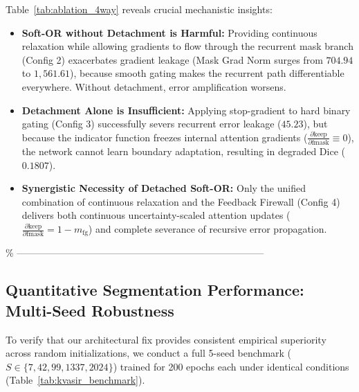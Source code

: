 Table~\ref{tab:ablation_4way} reveals crucial mechanistic insights:
\begin{itemize}
  \item \textbf{Soft-OR without Detachment is Harmful:} Providing continuous
        relaxation while allowing gradients to flow through the recurrent mask
        branch (Config 2) exacerbates gradient leakage (Mask Grad Norm surges
        from $704.94$ to $1{,}561.61$), because smooth gating makes the recurrent
        path differentiable everywhere. Without detachment, error amplification worsens.
  \item \textbf{Detachment Alone is Insufficient:} Applying stop-gradient to hard
        binary gating (Config 3) successfully severs recurrent error leakage
        ($45.23$), but because the indicator function freezes internal attention
        gradients ($\frac{\partial \text{keep}}{\partial \text{fmask}} \equiv 0$),
        the network cannot learn boundary adaptation, resulting in degraded Dice ($0.1807$).
  \item \textbf{Synergistic Necessity of Detached Soft-OR:} Only the unified
        combination of continuous relaxation and the Feedback Firewall (Config 4)
        delivers both continuous uncertainty-scaled attention updates
        ($\frac{\partial \text{keep}}{\partial \text{fmask}} = 1 - m_{\text{fg}}$)
        and complete severance of recursive error propagation.
\end{itemize}

\% -----------------------------------------------------------------------------
\subsection{Quantitative Segmentation Performance: Multi-Seed Robustness}
To verify that our architectural fix provides consistent empirical
superiority across random initializations, we conduct a full 5-seed benchmark
($S \in \{7, 42, 99, 1337, 2024\}$) trained for 200 epochs each under
identical conditions (Table~\ref{tab:kvasir_benchmark}).

